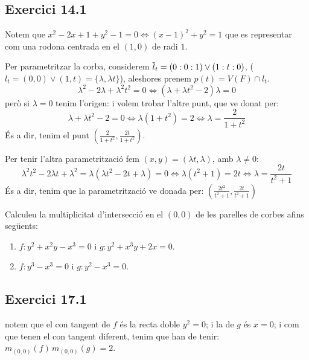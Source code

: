 \documentclass[11pt, a4paper]{article}
\begin{document}
\subsection{Exercici 14.1}
Notem que $x^2-2x+1+y^2-1=0\iff\left(x-1\right)^2+y^2=1$ que es representar com una rodona centrada en el $\left(1,0\right)$ de radi $1$.\par
\begin{center}
\end{center}
Per parametritzar la corba, considerem $\overline l_t=(0:0:1)\vee (1:t:0)$, ($l_t=(0,0)\vee(1,t)=\{\lambda,\lambda t\}$), aleshores prenem $p(t)=V(F)\cap l_t$.
\[
    \lambda^2-2\lambda+\lambda^2t^2=0\iff
    (\lambda+\lambda t^2-2)\lambda=0
\]
però si $\lambda=0$ tenim l'origen: i volem trobar l'altre punt, que ve donat per:
\[
    \lambda+\lambda t^2-2=0\iff 
    \lambda(1+ t^2)=2\iff 
    \lambda=\frac{2}{1+t^2}
\]
És a dir, tenim el punt $\left(\frac{2}{1+t^2},\frac{2t}{1+t^2}\right)$.\par
Per tenir l'altra parametrització fem $(x,y)=(\lambda t,\lambda)$, amb $\lambda\neq0$:
\[
    \lambda^2t^2-2\lambda t+\lambda^2=
    \lambda(\lambda t^2-2t+\lambda)=0\iff 
    \lambda(t^2+1)=2t\iff \lambda=\frac{2t}{t^2+1}
\]
És a dir, tenim que la parametrització ve donada per: $\left(\frac{2t^2}{t^2+1},\frac{2t}{t^2+1}\right)$
\newpage
\begin{tcolorbox}[title=\section{Exercici 17}]
Calculeu la multiplicitat d'intersecció en el $(0, 0)$ de les parelles de corbes afins següents:
\begin{enumerate}
    \item $f:y^2 + x^2y - x ^3 = 0$ i $g:y^2 + x^3y + 2x = 0$.
    \item $f:y^3 - x^3=0$ i $g:y^2-x^3=0$.
\end{enumerate}
\end{tcolorbox}
\subsection{Exercici 17.1}
notem que el con tangent de $f$ és la recta doble $y^2=0$; i la de $g$ és $x=0$; i com que tenen el con tangent diferent, tenim que han de tenir: $m_{(0,0)}(f)\,m_{(0,0)}(g)=2$.
\end{document}

